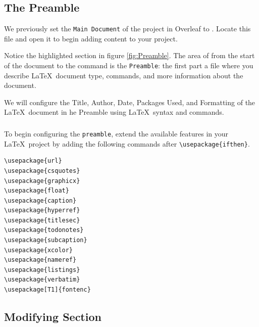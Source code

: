 \subsection{The Preamble}
We previously set the \texttt{Main Document} of the project in Overleaf to
. Locate this file and open it to begin adding content to your project.

\begin{minipage}{\linewidth}
\centering
{}
\label{fig:Preamble}
\end{minipage}

Notice the highlighted section in figure \ref{fig:Preamble}. The area of from the start of the document to the \verb|| command is the \texttt{Preamble}: the first part a file where you describe \LaTeX\ document type, commands, and more information about the document.

We will configure the Title, Author, Date, Packages Used, and Formatting of the \LaTeX\ document in he Preamble using \LaTeX\ syntax and commands.

\subsubsection{}
To begin configuring the \texttt{preamble}, extend the available features in your \LaTeX\ project by adding the following commands after \verb|\usepackage{ifthen}|.
\begin{verbatim}
\usepackage{url}
\usepackage{csquotes}
\usepackage{graphicx}
\usepackage{float}
\usepackage{caption}
\usepackage{hyperref}
\usepackage{titlesec}
\usepackage{todonotes}
\usepackage{subcaption}
\usepackage{xcolor}
\usepackage{nameref}
\usepackage{listings}
\usepackage{verbatim}
\usepackage[T1]{fontenc}
\end{verbatim}

\subsection{Modifying Section}